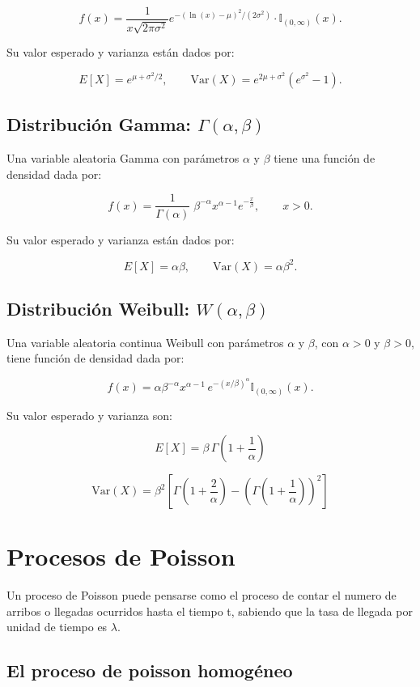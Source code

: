 \documentclass[11pt, a4paper]{article}
\theoremstyle{definition}
\begin{document}
\[f(x)=\frac{1}{x\sqrt{2\pi\sigma^{2}}}e^{-(\ln(x)-\mu)^{2}/(2\sigma^{2})}\cdot \mathbb{I}_{(0,\infty)}(x).\]

Su valor esperado y varianza están dados por:

\[E[X]=e^{\mu+\sigma^{2}/2},\qquad \text{Var}(X)=e^{2\mu+\sigma^{2}}(e^{\sigma^{2}}-1).\]

\subsection*{Distribución Gamma: $\Gamma(\alpha,\beta)$}
Una variable aleatoria Gamma con parámetros $\alpha$ y $\beta$ tiene una función de densidad dada por:

\[f(x)=\frac{1}{\Gamma(\alpha)}\;\beta^{-\alpha}x^{\alpha-1}e^{-\frac{x}{\beta}}, \qquad x>0.\]

Su valor esperado y varianza están dados por:

\[E[X]=\alpha\beta,\qquad \text{Var}(X)=\alpha\beta^{2}.\]

\subsection*{Distribución Weibull: $W(\alpha,\beta)$}
Una variable aleatoria continua Weibull con parámetros $\alpha$ y $\beta$, con $\alpha>0$ y $\beta>0$, tiene función de densidad dada por:

\[f(x) = \alpha\beta^{-\alpha}x^{\alpha-1}\,e^{-(x/\beta)^{\alpha}}\mathbb{I}_{(0,\infty)}(x).\]

Su valor esperado y varianza son:

\[E[X] = \beta\,\Gamma\left(1+\frac{1}{\alpha}\right)\]

\[\text{Var}(X) = \beta^2\left[\Gamma\left(1+\frac{2}{\alpha}\right) - \left(\Gamma\left(1+\frac{1}{\alpha}\right)\right)^2\right]\]

\newpage

\section{Procesos de Poisson}

Un proceso de Poisson puede pensarse como el proceso de contar el numero de arribos o
llegadas ocurridos hasta el tiempo t, sabiendo que la tasa de llegada por unidad de tiempo es $\lambda$. 

\subsection{El proceso de poisson homogéneo}
\end{document}
